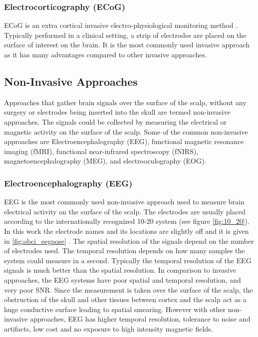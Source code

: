\subsubsection{Electrocorticography (ECoG)}
ECoG is an extra cortical invasive electro-physiological monitoring method \cite{2021_Book_Deep_Learning_EEG}. Typically performed in a clinical setting, a strip of electrodes are placed on the surface of interest on the brain. It is the most commonly used invasive approach as it has many advantages compared to other invasive approaches.

\subsection{Non-Invasive Approaches}
Approaches that gather brain signals over the surface of the scalp, without any surgery or electrodes being inserted into the skull are termed non-invasive approaches. The signals could be collected by measuring the electrical or magnetic activity on the surface of the scalp. Some of the common non-invasive approaches are Electroencephalography (EEG), functional magnetic resonance imaging (fMRI), functional near-infrared spectroscopy (fNIRS), magnetoencephalography (MEG), and electrooculography (EOG).
    

\subsubsection{Electroencephalography (EEG)}
EEG is the most commonly used non-invasive approach used to measure brain electrical activity on the surface of the scalp. The electrodes are usually placed according to the internationally recognized 10-20 system (see figure \ref{fig:10_20}). In this work the electrode names and its locations are slightly off and it is given in \ref{fig:obci_eegpose} \cite{1020_system_oci}. The spatial resolution of the signals depend on the number of electrodes used. The temporal resolution depends on how many samples the system could measure in a second. Typically the temporal resolution of the EEG signals is much better than the spatial resolution. In comparison to invasive approaches, the EEG systems have poor spatial and temporal resolution, and very poor SNR\cite{2013_Book_BCI_Intro}. Since the measurement is taken over the surface of the scalp, the obstruction of the skull and other tissues between cortex and the scalp act as a huge conductive surface leading to spatial smearing. However with other non-invasive approaches, EEG has higher temporal resolution, tolerance to noise and artifacts, low cost and no exposure to high intensity magnetic fields.

